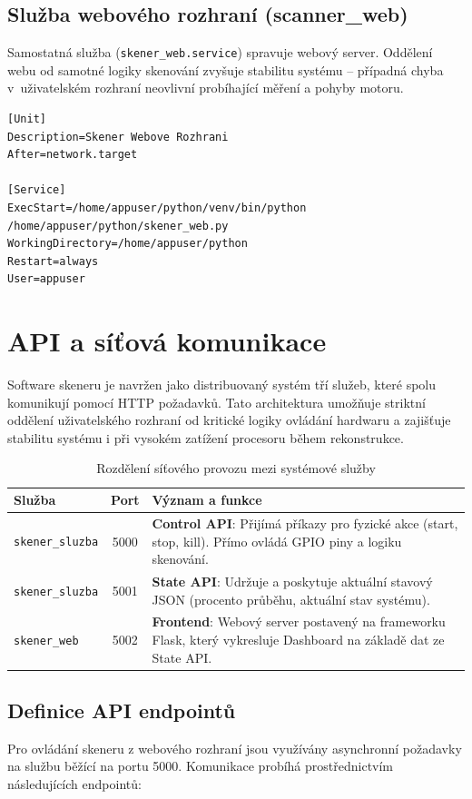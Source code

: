 \documentclass[12pt,a4paper]{report}
\begin{document}
\subsection{Služba webového rozhraní (scanner\_web)}
Samostatná služba (\texttt{skener\_web.service}) spravuje webový server. Oddělení webu od samotné logiky skenování zvyšuje stabilitu systému – případná chyba v~uživatelském rozhraní neovlivní probíhající měření a pohyby motoru.

\begin{lstlisting}[caption=Konfigurace služby pro webové rozhraní]
[Unit]
Description=Skener Webove Rozhrani
After=network.target

[Service]
ExecStart=/home/appuser/python/venv/bin/python /home/appuser/python/skener_web.py
WorkingDirectory=/home/appuser/python
Restart=always
User=appuser
\end{lstlisting}
\clearpage
\section{API a síťová komunikace}
Software skeneru je navržen jako distribuovaný systém tří služeb, které spolu komunikují pomocí HTTP požadavků. Tato architektura umožňuje striktní oddělení uživatelského rozhraní od kritické logiky ovládání hardwaru a zajišťuje stabilitu systému i při vysokém zatížení procesoru během rekonstrukce.

\begin{table}[H]
    \centering
    \begin{tabular}{|l|c|p{8cm}|}
        \hline
        \textbf{Služba} & \textbf{Port} & \textbf{Význam a funkce} \\ \hline
        \texttt{skener\_sluzba} & 5000 & \textbf{Control API}: Přijímá příkazy pro fyzické akce (start, stop, kill). Přímo ovládá GPIO piny a logiku skenování. \\ \hline
        \texttt{skener\_sluzba} & 5001 & \textbf{State API}: Udržuje a poskytuje aktuální stavový JSON (procento průběhu, aktuální stav systému). \\ \hline
        \texttt{skener\_web} & 5002 & \textbf{Frontend}: Webový server postavený na \mbox{frameworku} Flask, který vykresluje \mbox{Dashboard} na základě dat ze State API. \\ \hline
    \end{tabular}
    \caption{Rozdělení síťového provozu mezi systémové služby}
\end{table}

\subsection{Definice API endpointů}
Pro ovládání skeneru z webového rozhraní jsou využívány asynchronní požadavky na službu běžící na portu 5000. Komunikace probíhá prostřednictvím následujících endpointů:
\end{document}
